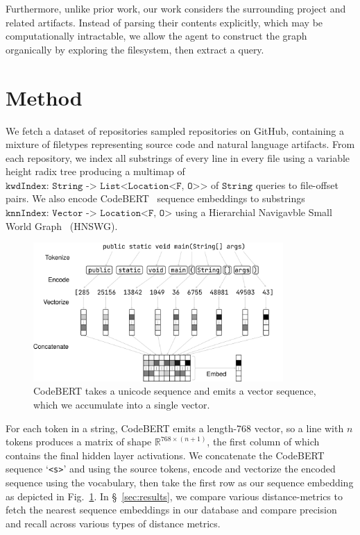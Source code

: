 \documentclass[11pt]{article}
\begin{document}
Furthermore, unlike prior work, our work considers the surrounding project and related artifacts. Instead of parsing their contents explicitly, which may be computationally intractable, we allow the agent to construct the graph organically by exploring the filesystem, then extract a query.

\section{Method}

We fetch a dataset of repositories sampled repositories on GitHub, containing a mixture of filetypes representing source code and natural language artifacts. From each repository, we index all substrings of every line in every file using a variable height radix tree producing a multimap of $\texttt{kwdIndex: String -> List<Location<F, O>>}$ of $\texttt{String}$  queries to file-offset pairs. We also encode CodeBERT~\citep{feng2020codebert} sequence embeddings to substrings $\texttt{knnIndex: Vector -> Location<F, O>}$ using a Hierarchial Navigavble Small World Graph~\citep{malkov2018efficient} (HNSWG).

\begin{figure}[H]
  \centering
  \includegraphics[width=0.85\textwidth]{bert_embedding}
  \caption{CodeBERT takes a unicode sequence and emits a vector sequence, which we accumulate into a single vector.}
  \label{fig:bert}
\end{figure}

For each token in a string, CodeBERT emits a length-768 vector, so a line with $n$ tokens produces a matrix of shape $\mathbb R^{768 \times (n + 1)}$, the first column of which contains the final hidden layer activations. We concatenate the CodeBERT sequence `\texttt{<s>}' and using the source tokens, encode and vectorize the encoded sequence using the vocabulary, then take the first row as our sequence embedding as depicted in Fig.~\ref{fig:bert}. In \S~\ref{sec:results}, we compare various distance-metrics to fetch the nearest sequence embeddings in our database and compare precision and recall across various types of distance metrics.
\end{document}
